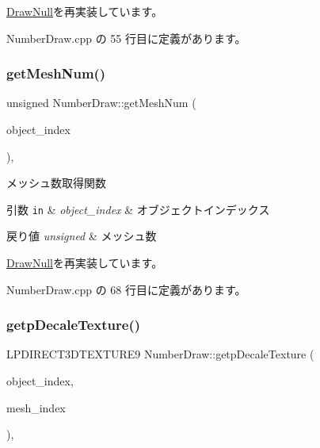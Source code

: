 \mbox{\hyperlink{class_draw_null_a72ac0b7dc40b1469582419dcc5b0e114}{Draw\+Null}}を再実装しています。



 Number\+Draw.\+cpp の 55 行目に定義があります。

\mbox{\label{class_number_draw_abcd88040b2b6d5dd7d21e8cfd50b1682}} 
\subsubsection{\texorpdfstring{get\+Mesh\+Num()}{getMeshNum()}}
{\footnotesize\ttfamily unsigned Number\+Draw\+::get\+Mesh\+Num (\begin{DoxyParamCaption}\item[{unsigned}]{object\+\_\+index }\end{DoxyParamCaption})\hspace{0.3cm}{\ttfamily [override]}, {\ttfamily [virtual]}}



メッシュ数取得関数 


\begin{DoxyParams}[1]{引数}
\mbox{\tt in}  & {\em object\+\_\+index} & オブジェクトインデックス \\
\hline
\end{DoxyParams}

\begin{DoxyRetVals}{戻り値}
{\em unsigned} & メッシュ数 \\
\hline
\end{DoxyRetVals}


\mbox{\hyperlink{class_draw_null_a4c566a37d27fac3dcf76c7970443f375}{Draw\+Null}}を再実装しています。



 Number\+Draw.\+cpp の 68 行目に定義があります。

\mbox{\label{class_number_draw_a77d155c00ac4637154e62904556de05a}} 
\subsubsection{\texorpdfstring{getp\+Decale\+Texture()}{getpDecaleTexture()}}
{\footnotesize\ttfamily L\+P\+D\+I\+R\+E\+C\+T3\+D\+T\+E\+X\+T\+U\+R\+E9 Number\+Draw\+::getp\+Decale\+Texture (\begin{DoxyParamCaption}\item[{unsigned}]{object\+\_\+index,  }\item[{unsigned}]{mesh\+\_\+index }\end{DoxyParamCaption})\hspace{0.3cm}{\ttfamily [override]}, {\ttfamily [virtual]}}



